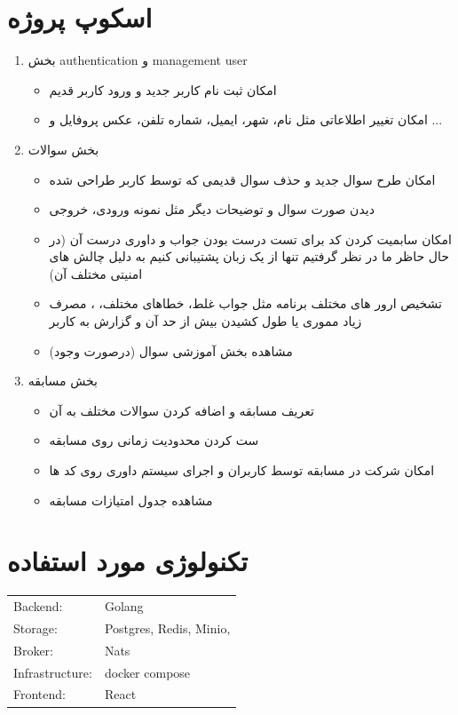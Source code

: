 \documentclass{article}
\begin{document}
	\section{اسکوپ پروژه}
	\begin{enumerate}
		\item بخش authentication  و management user
			\begin{itemize}
				\item امکان ثبت نام کاربر جدید و ورود کاربر قدیم
				\item امکان تغییر اطلاعاتی مثل نام، شهر، ایمیل، شماره تلفن، عکس پروفایل و ...
			\end{itemize}
		\item بخش  سوالات
			\begin{itemize}
				\item امکان طرح سوال جدید و حذف سوال قدیمی که توسط کاربر طراحی شده
				\item دیدن صورت سوال و توضیحات دیگر مثل نمونه ورودی، خروجی 
				\item امکان سابمیت کردن کد برای تست درست بودن جواب و داوری درست آن (در حال حاظر ما در نظر گرفتیم تنها از یک زبان پشتیبانی کنیم به دلیل چالش های امنیتی مختلف آن)
				\item تشخیص ارور های مختلف برنامه مثل جواب غلط، خطاهای مختلف، ، مصرف زیاد مموری یا طول کشیدن بیش از حد آن و گزارش به کاربر
				\item مشاهده بخش آموزشی سوال (درصورت وجود)
			\end{itemize}
		\item بخش مسابقه
		\begin{itemize}
			\item تعریف مسابقه و اضافه کردن سوالات مختلف به آن
			\item ست کردن محدودیت زمانی روی مسابقه
			\item امکان شرکت در مسابقه توسط کاربران و اجرای سیستم داوری روی کد ها
			\item مشاهده جدول امتیازات مسابقه
		\end{itemize}
	\end{enumerate}
	
	\section{تکنولوژی مورد استفاده}
		\begin{LTR}
			\begin{tabular}{ l l }
				Backend: & Golang \\
				Storage: & Postgres, Redis,  Minio, \\
				Broker: & Nats \\
				Infrastructure: & docker compose \\
				Frontend: & React
			\end{tabular}
		\end{LTR}
\end{document}
